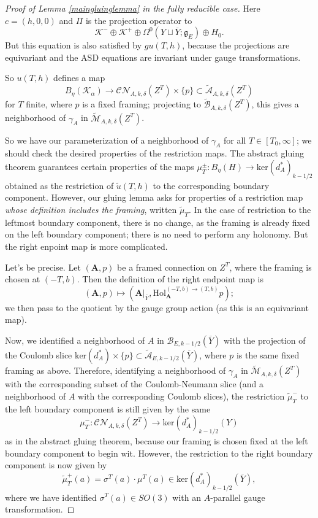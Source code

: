\documentclass{memo-l}
\theoremstyle{definition}
\theoremstyle{remark}
\numberwithin{section}{chapter}
\numberwithin{equation}{chapter}
\begin{document}
\begin{proof}[Proof of Lemma \ref{maingluinglemma} in the fully reducible case]
Here $c = (h, 0, 0)$ and $\Pi$ is the projection operator to 
$$\mathcal K^- \oplus \mathcal K^+ \oplus \Omega^0(Y \sqcup \overline{Y};\mathfrak g_E) \oplus H_0.$$ 
But this equation is also satisfied by $gu(T, h)$, because the projections are equivariant and the ASD equations are invariant under gauge transformations.

So $u(T,h)$ defines a map $$B_\eta(\mathcal K_\alpha) \to \mathcal{CN}_{A,k,\delta}(Z^T) \times \{p\} \subset \widetilde{\mathcal A}_{A,k,\delta}(Z^T)$$ for $T$ finite, where $p$ is a fixed framing; projecting to $\widetilde{\mathcal B}_{A,k,\delta}(Z^T)$, this gives a neighborhood of $\gamma_A$ in $\widetilde{\mathcal M}_{A,k,\delta}(Z^T)$.

So we have our parameterization of a neighborhood of $\gamma_A$ for all $T \in [T_0, \infty]$; we should check the desired properties of the restriction maps. The abstract gluing theorem guarantees certain properties of the maps $\mu^\pm_T: B_\eta(H) \to \text{ker}(d_A^*)_{k-1/2}$ obtained as the restriction of $\widetilde u(T, h)$ to the corresponding boundary component. However, our gluing lemma asks for properties of a restriction map \emph{whose definition includes the framing}, written $\widetilde \mu_T$. In the case of restriction to the leftmost boundary component, there is no change, as the framing is already fixed on the left boundary component; there is no need to perform any holonomy. But the right enpoint map is more complicated.

Let's be precise. Let $(\mathbf{A},p)$ be a framed connection on $Z^T$, where the framing is chosen at $(-T, b)$. Then the definition of the right endpoint map is $$(\mathbf{A},p) \mapsto \left(\mathbf{A}\big|_{\overline Y}, \text{Hol}^{(-T,b) \to (T,b)}_{\mathbf{A}} p\right);$$ we then pass to the quotient by the gauge group action (as this is an equivariant map).

Now, we identified a neighborhood of $A$ in $\mathcal B_{E,k-1/2}(\overline Y)$ with the projection of the Coulomb slice $\text{ker}(d_A^*) \times \{p\} \subset \widetilde{\mathcal A}_{E,k-1/2}(\overline Y)$, where $p$ is the same fixed framing as above. Therefore, identifying a neighborhood of $\gamma_A$ in $\widetilde{\mathcal M}_{A,k,\delta}(Z^T)$ with the corresponding subset of the Coulomb-Neumann slice (and a neighborhood of $A$ with the corresponding Coulomb slices), the restriction $\widetilde{\mu}_T^-$ to the left boundary component is still given by the same 
$$\mu_T^-: \mathcal{CN}_{A,k,\delta}(Z^T) \to \text{ker}(d_A^*)_{k-1/2}(Y)$$ 
as in the abstract gluing theorem, because our framing is chosen fixed at the left boundary component to begin wit. However, the restriction to the right boundary component is now given by 
$$\widetilde{\mu}_T^+(a) = \sigma^T(a) \cdot \mu^T(a) \in \text{ker}(d^*_A)_{k-1/2}(\overline Y),$$ 
where we have identified $\sigma^T(a) \in SO(3)$ with an $A$-parallel gauge transformation.


\end{proof}
\end{document}
